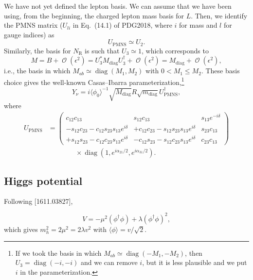 \documentclass[english,11pt,a4paper]{article}
\numberwithin{equation}{section}  %
\newcommand\w[1]{_{\mathrm{#1}}}
\newcommand\pmat[1]{\begin{pmatrix}#1\end{pmatrix}} %
\DeclareMathOperator{\Order}{\mathcal{O}}
\newcommand\vev[1]{\langle#1\rangle}
\newcommand\NR{{N\w R}}
\DeclareMathOperator{\diag}{\mathrm{diag}}
\begin{document}
We have not yet defined the lepton basis.
We can assume that we have been using, from the beginning, the charged lepton mass basis for $L$.
Then, we identify the PMNS matrix ($U_{li}$ in Eq.~(14.1) of PDG2018, where $i$ for mass and $l$ for gauge indices) as
\begin{equation}
 U\w{PMNS} \simeq U_2.
\end{equation}
Similarly, the basis for $\NR$ is such that $U_3 \simeq 1$, which corresponds to
\begin{equation}
 M = B + \Order(\epsilon^2) = U_3^* M\w{diag} U_3^\dagger +\Order(\epsilon^2) = M\w{diag} + \Order(\epsilon^2),
\end{equation}
i.e., the basis in which $M_{ab}\simeq\diag(M_1, M_2)$ with $0<M_1\le M_2$.
These basis choice gives the well-known Casas--Ibarra parameterization,\footnote{
If we took the basis in which $M_{ab}\simeq\diag(-M_1, -M_2)$, then $U_3=\diag(-i, -i)$ and we can remove $i$, but it is less plausible and we put $i$ in the parameterization.
}
\begin{equation}
 Y_\nu = i\vev{\phi_0}^{-1}\sqrt{M\w{diag}}R\sqrt{m\w{diag}}U\w{PMNS}^\dagger,
\end{equation}
where
\begin{equation}\begin{split}
 U\w{PMNS} &= \pmat{
                 c_{12}      c_{13}             &                 s_{12}      c_{13}            &       s_{13} e^{-i\delta} \\
 -s_{12}c_{23} - c_{12}s_{23}s_{13}e^{i\delta}  & +c_{12}c_{23} - s_{12}s_{23}s_{13}e^{i\delta} & s_{23}c_{13}\\
 +s_{12}s_{23} - c_{12}c_{23}s_{13}e^{i\delta}  & -c_{12}s_{23} - s_{12}c_{23}s_{13}e^{i\delta} & c_{23}c_{13}
}
\\&\qquad\qquad
\times\diag(1, e^{i\alpha_{21}/2}, e^{i\alpha_{31}/2}).
\end{split}\end{equation}

\subsection{Higgs potential}
Following [1611.03827],

\begin{equation}
 V = -\mu^2(\phi^\dagger \phi) + \lambda(\phi^\dagger \phi)^2,
\end{equation}
which gives $m_h^2 = 2\mu^2 = 2\lambda v^2$ with $\vev{\phi}=v/\sqrt{2}$.
\end{document}
